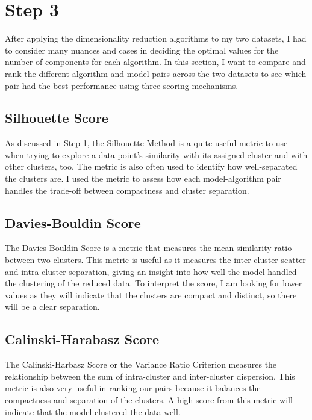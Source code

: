 \documentclass[conference]{IEEEtran}
\begin{document}
\section{Step 3}
After applying the dimensionality reduction algorithms to my two datasets, I had to consider many nuances and cases in deciding the optimal values for the number of components for each algorithm. In this section, I want to compare and rank the different algorithm and model pairs across the two datasets to see which pair had the best performance using three scoring mechanisms.
\subsection{Silhouette Score}
\par As discussed in Step 1, the Silhouette Method is a quite useful metric to use when trying to explore a data point's similarity with its assigned cluster and with other clusters, too. The metric is also often used to identify how well-separated the clusters are. I used the metric to assess how each model-algorithm pair handles the trade-off between compactness and cluster separation.
\subsection{Davies-Bouldin Score}
\par The Davies-Bouldin Score is a metric that measures the mean similarity ratio between two clusters. This metric is useful as it measures the inter-cluster scatter and intra-cluster separation, giving an insight into how well the model handled the clustering of the reduced data. To interpret the score, I am looking for lower values as they will indicate that the clusters are compact and distinct, so there will be a clear separation.
\subsection{Calinski-Harabasz Score}
The Calinski-Harbasz Score or the Variance Ratio Criterion measures the relationship between the sum of intra-cluster and inter-cluster dispersion. This metric is also very useful in ranking our pairs because it balances the compactness and separation of the clusters. A high score from this metric will indicate that the model clustered the data well.
\end{document}
